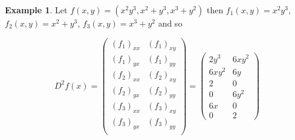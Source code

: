 \documentclass[11pt,openany]{book}
\theoremstyle{plain}
\theoremstyle{definition}
\newtheorem{example}{Example}[chapter]
\theoremstyle{remark}
\begin{document}
\begin{example}
Let $f(x,y)=(x^2y^3,x^2+y^3,x^3+y^2)$ then $f_1(x,y) = x^2y^3$, $f_2(x,y)=x^2+y^3$, $f_3(x,y)=x^3+y^2$ and so 
    
    \[D^2f(x) = \begin{pmatrix}
        (f_1)_{xx} & (f_1)_{xy}\\
        (f_1)_{yx} & (f_1)_{yy} \\
        (f_2)_{xx} & (f_2)_{xy}\\
        (f_2)_{yx} & (f_2)_{yy} \\
        (f_3)_{xx} & (f_3)_{xy}\\
        (f_3)_{yx} & (f_3)_{yy} \\
    \end{pmatrix} = \begin{pmatrix}
        2y^3 & 6xy^2\\
        6xy^2 & 6y\\
        2 & 0 \\
        0 & 6y^2 \\
        6x & 0 \\
        0 & 2
    \end{pmatrix}\]
\end{example}
\end{document}
